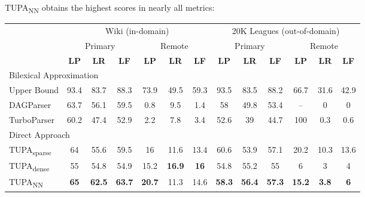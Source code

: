 \documentclass[a0,portrait]{a0poster}
\newcommand{\parser}[1]{TUPA\textsubscript{#1}}
\begin{document}
\begin{multicols}{2}
\parser{NN} obtains the highest scores in nearly all metrics:
	  
\begin{center}
	\begin{tabular}{l|ccc|ccc||ccc|ccc}
	& \multicolumn{6}{c||}{Wiki (in-domain)} & \multicolumn{6}{c}{20K Leagues (out-of-domain)} \\
	& \multicolumn{3}{c|}{Primary} & \multicolumn{3}{c||}{Remote}
	& \multicolumn{3}{c|}{Primary} & \multicolumn{3}{c}{Remote} \\
	& \textbf{LP} & \textbf{LR} & \textbf{LF} & \textbf{LP} & \textbf{LR} & \textbf{LF}
	& \textbf{LP} & \textbf{LR} & \textbf{LF} & \textbf{LP} & \textbf{LR} & \textbf{LF} \\
	\hline
	\multicolumn{4}{l}{\rule{0pt}{2ex} \footnotesize Bilexical Approximation} \\
	Upper Bound %
	& 93.4 & 83.7 & 88.3 & 73.9 & 49.5 & 59.3
	& 93.5 & 83.5 & 88.2 & 66.7 & 31.6 & 42.9 \vspace{.1cm} \\
	DAGParser \cite{ribeyre-villemontedelaclergerie-seddah:2014:SemEval}
	& 63.7 & 	56.1	 & 59.5	 & 0.8	 & 9.5	 &  1.4
	& 58	 & 49.8	 & 53.4 & -- & 0 & 0 \\
	TurboParser \cite{almeida-martins:2015:SemEval}
	& 60.2	 & 47.4	 & 52.9	 & 2.2	 & 7.8	 &  3.4
	& 52.6	 & 39	 & 44.7	 & 100	 & 0.3	 & 0.6 \\
	\hline
	\multicolumn{4}{l}{\rule{0pt}{2ex} \footnotesize Direct Approach} \\
	\parser{sparse}
	& 64 & 55.6 & 59.5 & 16 & 11.6 & 13.4 
	& 60.6 & 53.9 & 57.1 & 20.2 & 10.3 & 13.6 \\
	\parser{dense} 
	& 55 & 54.8 & 54.9 & 15.2 & {\bf 16.9} & {\bf 16}
	& 54.8 & 55.2 & 55 & 6 & 3 & 4 \\
	\parser{NN}
	& {\bf 65} & {\bf 62.5} & {\bf 63.7} & {\bf 20.7} & 11.3 & 14.6
	& {\bf 58.3} & {\bf 56.4} & {\bf 57.3} & {\bf 15.2} & {\bf 3.8} & {\bf 6}
	\end{tabular}
\end{center}


\end{multicols}
\end{document}
